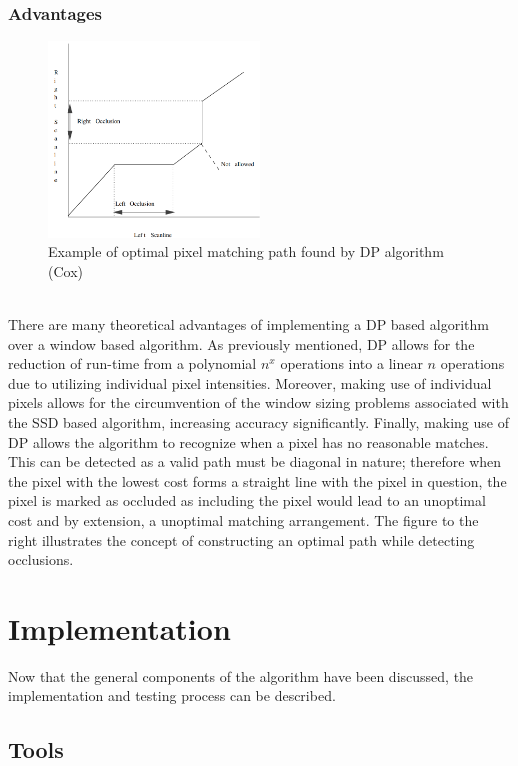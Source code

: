 \documentclass[11pt]{scrartcl}
\begin{document}
\subsubsection{Advantages}

\begin{figure}
	\includegraphics[width=0.5\textwidth]{dpG.png}
	\caption{\label{fig:frog1} Example of optimal pixel matching path found by DP algorithm (Cox)}
\end{figure}
\\ 
There are many theoretical advantages of implementing
a DP based algorithm over a window based algorithm. 
As previously mentioned, DP allows for the reduction 
of run-time from a polynomial $n^x$ operations into 
a linear $n$ operations due to utilizing individual 
pixel intensities. Moreover, making use of individual pixels 
allows for the circumvention of the window sizing problems 
associated with the SSD based algorithm, increasing accuracy 
significantly. Finally, making use of DP allows the algorithm 
to recognize when a pixel has no reasonable matches. This can be detected 
as a valid path must be diagonal in nature; therefore when the pixel with the 
lowest cost forms a straight line with the pixel in question, the pixel is marked 
as occluded as including the pixel would lead to an unoptimal cost and by extension, 
a unoptimal matching arrangement. The figure to the right illustrates the concept 
of constructing an optimal path while detecting occlusions. 



\section{Implementation}
Now that the general components of the algorithm have been discussed, the implementation 
and testing process can be described. 

\subsection{Tools}
\end{document}
